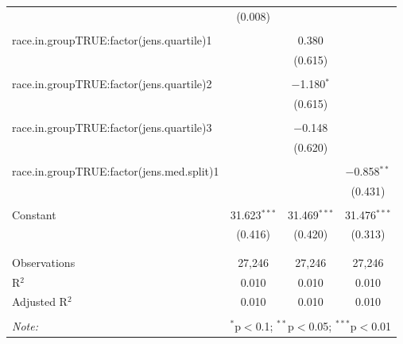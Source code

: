 \begin{table}[!htbp]
\begin{tabular}{@{\extracolsep{5pt}}lccc}
  & (0.008) &  &  \\ 
  & & & \\ 
 race.in.groupTRUE:factor(jens.quartile)1 &  & 0.380 &  \\ 
  &  & (0.615) &  \\ 
  & & & \\ 
 race.in.groupTRUE:factor(jens.quartile)2 &  & $-$1.180$^{*}$ &  \\ 
  &  & (0.615) &  \\ 
  & & & \\ 
 race.in.groupTRUE:factor(jens.quartile)3 &  & $-$0.148 &  \\ 
  &  & (0.620) &  \\ 
  & & & \\ 
 race.in.groupTRUE:factor(jens.med.split)1 &  &  & $-$0.858$^{**}$ \\ 
  &  &  & (0.431) \\ 
  & & & \\ 
 Constant & 31.623$^{***}$ & 31.469$^{***}$ & 31.476$^{***}$ \\ 
  & (0.416) & (0.420) & (0.313) \\ 
  & & & \\ 
\hline \\[-1.8ex] 
Observations & 27,246 & 27,246 & 27,246 \\ 
R$^{2}$ & 0.010 & 0.010 & 0.010 \\ 
Adjusted R$^{2}$ & 0.010 & 0.010 & 0.010 \\ 
\hline 
\hline \\[-1.8ex] 
\textit{Note:}  & \multicolumn{3}{r}{$^{*}$p$<$0.1; $^{**}$p$<$0.05; $^{***}$p$<$0.01} \\ 
\end{tabular} 
\end{table} 
